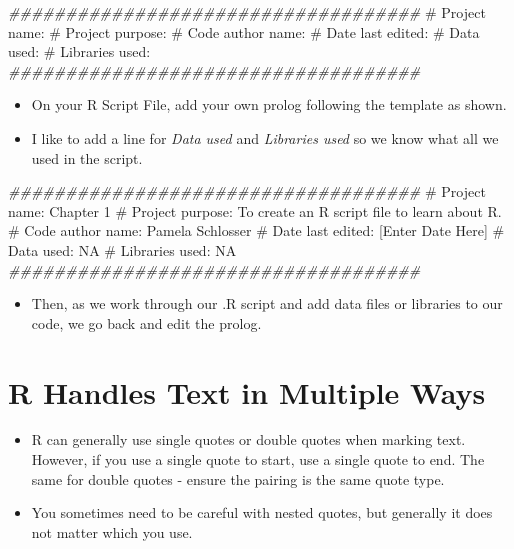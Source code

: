 \documentclass[
  letterpaper,
  DIV=11,
  numbers=noendperiod]{scrreprt}
\newenvironment{Shaded}{\begin{snugshade}}{\end{snugshade}}
\newcommand{\CommentTok}[1]{\textcolor[rgb]{0.37,0.37,0.37}{#1}}
\newcommand{\DocumentationTok}[1]{\textcolor[rgb]{0.37,0.37,0.37}{\textit{#1}}}
\providecommand{\tightlist}{%
  \setlength{\itemsep}{0pt}\setlength{\parskip}{0pt}}\usepackage{longtable,booktabs,array}
\begin{document}
\begin{Shaded}
\begin{Highlighting}[]
\DocumentationTok{\#\#\#\#\#\#\#\#\#\#\#\#\#\#\#\#\#\#\#\#\#\#\#\#\#\#\#\#\#\#\#\#\#\#\#\#}
\CommentTok{\# Project name: }
\CommentTok{\# Project purpose: }
\CommentTok{\# Code author name: }
\CommentTok{\# Date last edited: }
\CommentTok{\# Data used: }
\CommentTok{\# Libraries used: }
\DocumentationTok{\#\#\#\#\#\#\#\#\#\#\#\#\#\#\#\#\#\#\#\#\#\#\#\#\#\#\#\#\#\#\#\#\#\#\#\#}
\end{Highlighting}
\end{Shaded}

\begin{itemize}
\tightlist
\item
  On your R Script File, add your own prolog following the template as
  shown.
\item
  I like to add a line for \emph{Data used} and \emph{Libraries used} so
  we know what all we used in the script.
\end{itemize}

\begin{Shaded}
\begin{Highlighting}[]
\DocumentationTok{\#\#\#\#\#\#\#\#\#\#\#\#\#\#\#\#\#\#\#\#\#\#\#\#\#\#\#\#\#\#\#\#\#\#\#\#}
\CommentTok{\# Project name: Chapter 1}
\CommentTok{\# Project purpose: To create an R script file to learn about R. }
\CommentTok{\# Code author name: Pamela Schlosser}
\CommentTok{\# Date last edited: [Enter Date Here]}
\CommentTok{\# Data used: NA}
\CommentTok{\# Libraries used: NA}
\DocumentationTok{\#\#\#\#\#\#\#\#\#\#\#\#\#\#\#\#\#\#\#\#\#\#\#\#\#\#\#\#\#\#\#\#\#\#\#\#}
\end{Highlighting}
\end{Shaded}

\begin{itemize}
\tightlist
\item
  Then, as we work through our .R script and add data files or libraries
  to our code, we go back and edit the prolog.
\end{itemize}

\section{R Handles Text in Multiple
Ways}\label{r-handles-text-in-multiple-ways}

\begin{itemize}
\tightlist
\item
  R can generally use single quotes or double quotes when marking text.
  However, if you use a single quote to start, use a single quote to
  end. The same for double quotes - ensure the pairing is the same quote
  type.
\item
  You sometimes need to be careful with nested quotes, but generally it
  does not matter which you use.
\end{itemize}
\end{document}
